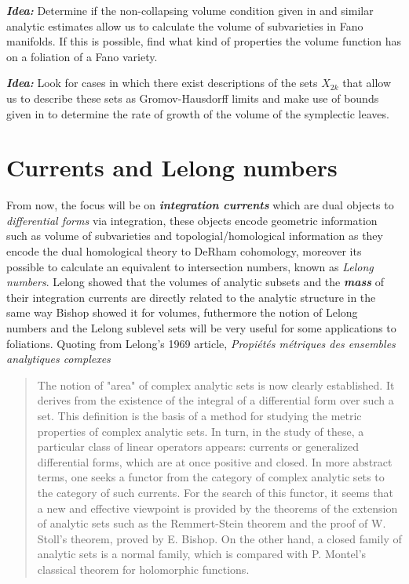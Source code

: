\documentclass[12pt,twoside,a4paper]{report}
\begin{document}
\noindent\emph{\bf Idea:} Determine if the non-collapsing volume condition given in \cite{D-SS} and similar analytic estimates allow us to calculate the volume of subvarieties in Fano manifolds. If this is possible, find what kind of properties the volume function has on a foliation of a Fano variety.

\noindent\emph{\bf Idea:} Look for cases in which there exist descriptions of the sets $X_{2k}$ that allow us to describe these sets as Gromov-Hausdorff limits and make use of bounds given in \cite{D-SS} to determine the rate of growth of the volume of the symplectic leaves.



\chapter{Currents and Lelong numbers}
\noindent From now, the focus will be on \emph{\bf integration currents} which are dual objects to \emph{differential forms} via integration, these objects encode geometric information such as volume of subvarieties and topologial/homological information as they encode the dual homological theory to DeRham cohomology, moreover its possible to calculate an equivalent  to intersection numbers, known as \emph{Lelong numbers}. Lelong showed that the volumes of analytic subsets and the \emph{\bf mass} of their integration currents are directly related to the analytic structure in the same way Bishop showed it for volumes, futhermore the notion of Lelong numbers and the Lelong sublevel sets will be very useful for some applications to foliations. Quoting from Lelong's 1969 article, \emph{Propiétés métriques des ensembles analytiques complexes}  
\begin{quote}
The notion of "area" of complex analytic sets is now clearly established. It derives from the existence of the integral of a differential form over such a set. This definition is the basis of a method for studying the metric properties of complex analytic sets. In turn, in the study of these, a particular class of linear operators appears: currents or generalized differential forms, which are at once positive and closed. In more abstract terms, one seeks a functor from the category of complex analytic sets to the category of such currents. For the search of this functor, it seems that a new and effective viewpoint is provided by the theorems of the extension of analytic sets such as the Remmert-Stein theorem and the proof of W. Stoll's theorem, proved by E. Bishop. On the other hand, a closed family of analytic sets is a normal family, which is compared with P. Montel's classical theorem for holomorphic functions.
\end{quote}
\end{document}
